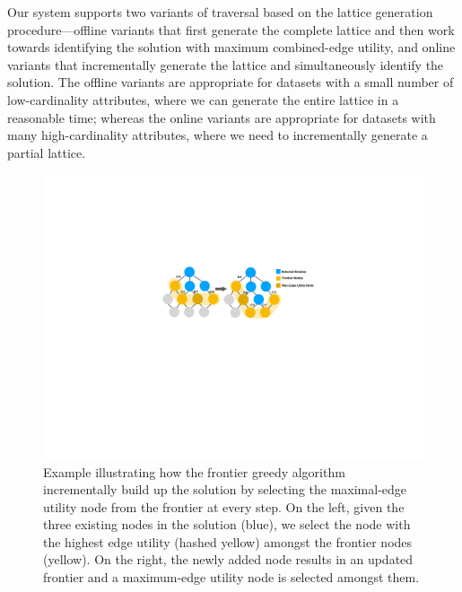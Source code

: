  Our system supports two variants of traversal based on the lattice generation procedure---offline variants that first generate the complete lattice and then work towards identifying the solution with maximum combined-edge utility, and online variants that incrementally generate the lattice and simultaneously identify the solution. The offline variants are appropriate for datasets with a small number of low-cardinality attributes, where we can generate the entire lattice in a reasonable time; whereas the online variants are appropriate for datasets with many high-cardinality attributes, where we need to incrementally generate a partial lattice. 
\begin{figure}[h!]
\centering
\includegraphics[width=\linewidth]{figures/frontier_greedy.pdf}
\caption{Example illustrating how the frontier greedy algorithm incrementally build up the solution by selecting the maximal-edge utility node from the frontier at every step. On the left, given the three existing nodes in the solution (blue), we select the node with the highest edge utility (hashed yellow) amongst the frontier nodes (yellow). On the right, the newly added node results in an updated frontier and a maximum-edge utility node is selected amongst them.}
\label{fig:frontier_greedy}
\end{figure}
